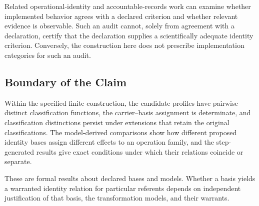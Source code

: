 Related operational-identity and accountable-records work can examine
whether implemented behavior agrees with a declared criterion and
whether relevant evidence is observable.
Such an audit cannot, solely from agreement with a declaration,
certify that the declaration supplies a scientifically adequate
identity criterion.
Conversely, the construction here does not prescribe implementation
categories for such an audit.

\subsection{Boundary of the Claim}
\label{subsec:limits_boundary_claim}

Within the specified finite construction, the candidate profiles
have pairwise distinct classification functions, the carrier--basis
assignment is determinate, and classification distinctions persist
under extensions that retain the original classifications.
The model-derived comparisons show how different proposed identity
bases assign different effects to an operation family, and the
step-generated results give exact conditions under which their
relations coincide or separate.

These are formal results about declared bases and models.
Whether a basis yields a warranted identity relation for particular
referents depends on independent justification of that basis, the
transformation models, and their warrants.
